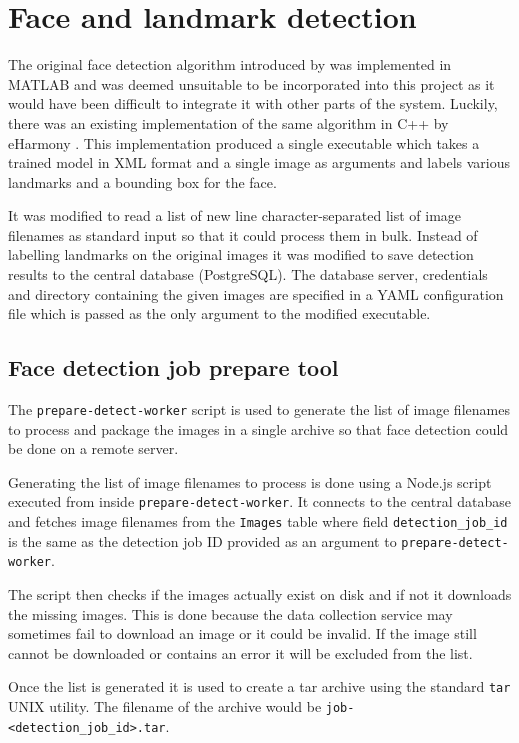 \section{Face and landmark detection}
\label{impl:fd}
The original face detection algorithm introduced by \citep{zhu2012face} was
implemented in MATLAB and was deemed unsuitable to be incorporated into this
project as it would have been difficult to integrate it with other parts of the
system. Luckily, there was an existing implementation of the same algorithm in
C++ by eHarmony \citep{eHphotofeature}. This implementation produced a single
executable which takes a trained model in XML format and a single image as
arguments and labels various landmarks and a bounding box for the face. 

It was modified to read a list of new line character-separated list of image
filenames as standard input so that it could process them in bulk. Instead of
labelling landmarks on the original images it was modified to save detection
results to the central database (PostgreSQL). The database server, credentials
and directory containing the given images are specified in a YAML configuration
file which is passed as the only argument to the modified executable.

\subsection{Face detection job prepare tool}
The \texttt{prepare-detect-worker} script is used to generate the list of image
filenames to process and package the images in a single archive so that face
detection could be done on a remote server.

Generating the list of image filenames to process is done using a Node.js
script executed from inside \texttt{prepare-detect-worker}. It connects to the
central database and fetches image filenames from the \texttt{Images} table
where field \texttt{detection\_job\_id} is the same as the detection job ID
provided as an argument to \texttt{prepare-detect-worker}.

The script then checks if the images actually exist on disk and if not it
downloads the missing images. This is done because the data collection service
may sometimes fail to download an image or it could be invalid. If the image
still cannot be downloaded or contains an error it will be excluded from the
list.

Once the list is generated it is used to create a tar archive using the
standard \texttt{tar} UNIX utility. The filename of the archive would be
\texttt{job-<detection\_job\_id>.tar}.

